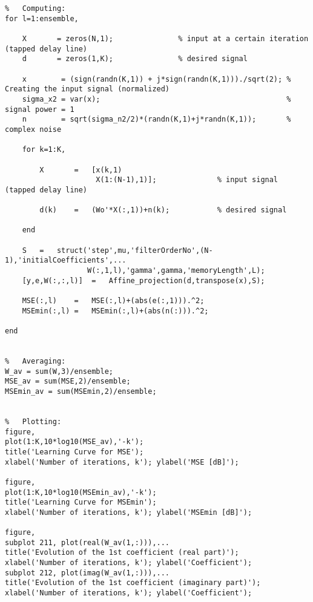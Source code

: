 \begin{lstlisting}
%   Computing:
for l=1:ensemble,

    X       = zeros(N,1);               % input at a certain iteration (tapped delay line)
    d       = zeros(1,K);               % desired signal

    x        = (sign(randn(K,1)) + j*sign(randn(K,1)))./sqrt(2); % Creating the input signal (normalized)
    sigma_x2 = var(x);                                           % signal power = 1
    n        = sqrt(sigma_n2/2)*(randn(K,1)+j*randn(K,1));       % complex noise

    for k=1:K,

        X       =   [x(k,1)
                     X(1:(N-1),1)];              % input signal (tapped delay line)

        d(k)    =   (Wo'*X(:,1))+n(k);           % desired signal

    end

    S   =   struct('step',mu,'filterOrderNo',(N-1),'initialCoefficients',...
                   W(:,1,l),'gamma',gamma,'memoryLength',L);
    [y,e,W(:,:,l)]  =   Affine_projection(d,transpose(x),S);

    MSE(:,l)    =   MSE(:,l)+(abs(e(:,1))).^2;
    MSEmin(:,l) =   MSEmin(:,l)+(abs(n(:))).^2;

end


%   Averaging:
W_av = sum(W,3)/ensemble;
MSE_av = sum(MSE,2)/ensemble;
MSEmin_av = sum(MSEmin,2)/ensemble;


%   Plotting:
figure,
plot(1:K,10*log10(MSE_av),'-k');
title('Learning Curve for MSE');
xlabel('Number of iterations, k'); ylabel('MSE [dB]');

figure,
plot(1:K,10*log10(MSEmin_av),'-k');
title('Learning Curve for MSEmin');
xlabel('Number of iterations, k'); ylabel('MSEmin [dB]');

figure,
subplot 211, plot(real(W_av(1,:))),...
title('Evolution of the 1st coefficient (real part)');
xlabel('Number of iterations, k'); ylabel('Coefficient');
subplot 212, plot(imag(W_av(1,:))),...
title('Evolution of the 1st coefficient (imaginary part)');
xlabel('Number of iterations, k'); ylabel('Coefficient');
\end{lstlisting}

